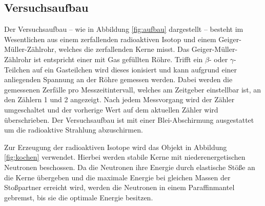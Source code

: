 \subsection{Versuchsaufbau}
\label{sec:Versuchsaufbau}
%
%
Der Versuchsaufbau -- wie in Abbildung \ref{fig:aufbau} dargestellt -- besteht im Wesentlichen 
aus einem zerfallenden radioaktiven Isotop und einem Geiger-Müller-Zählrohr, welches die 
zerfallenden Kerne misst.
Das Geiger-Müller-Zählrohr ist entspricht einer mit Gas gefüllten Röhre. Trifft ein $\beta$-
oder $\gamma$- Teilchen auf ein Gasteilchen wird dieses ionisiert und kann aufgrund einer
anliegenden Spannung an der Röhre gemessen werden.
Dabei werden die gemessenen Zerfälle pro Messzeitintervall, welches am Zeitgeber einstellbar 
ist, an den Zählern 1 und 2 angezeigt. Nach jedem Messvorgang wird der Zähler umgeschaltet und 
der vorherige Wert auf dem aktuellen Zähler wird überschrieben. Der Versuchsaufbau ist mit
einer Blei-Abschirmung ausgestattet um die radioaktive Strahlung abzuschirmen.

Zur Erzeugung der radioaktiven Isotope wird das Objekt in Abbildung \ref{fig:kochen} verwendet.
Hierbei werden stabile Kerne mit niederenergetischen Neutronen beschossen. 
Da die Neutronen ihre Energie durch elastische Stöße an die Kerne übergeben und die maximale
Energie bei gleichen Massen der Stoßpartner erreicht wird, werden die Neutronen in einem 
Paraffinmantel gebremst, bis sie die optimale Energie besitzen.
